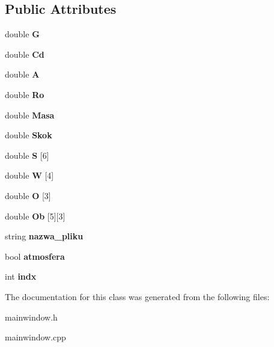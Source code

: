 \subsection*{Public Attributes}
\begin{DoxyCompactItemize}
\item 
\mbox{\label{class_main_window_ae07483988be03b22941a090dc36836df}} 
double {\bfseries G}
\item 
\mbox{\label{class_main_window_afe8a5e23f01e4779ad2bf9dddd470351}} 
double {\bfseries Cd}
\item 
\mbox{\label{class_main_window_a3e24497d6e558c83fd2b13d13aeb8db1}} 
double {\bfseries A}
\item 
\mbox{\label{class_main_window_a555e4c65f17f825ed8790bb592cafed6}} 
double {\bfseries Ro}
\item 
\mbox{\label{class_main_window_a59ffdff998bf720fca8709eec9035b26}} 
double {\bfseries Masa}
\item 
\mbox{\label{class_main_window_ab319253eb1520a69c4d8b435f4c54330}} 
double {\bfseries Skok}
\item 
\mbox{\label{class_main_window_a8cdea7d6a643c5fd2cfdcccc7b07ae28}} 
double {\bfseries S} \mbox{[}6\mbox{]}
\item 
\mbox{\label{class_main_window_aff1acdcf582000aa1f7e764ba590aa9d}} 
double {\bfseries W} \mbox{[}4\mbox{]}
\item 
\mbox{\label{class_main_window_ae6e89bf5abd465f0ca42d42e76ce4ec2}} 
double {\bfseries O} \mbox{[}3\mbox{]}
\item 
\mbox{\label{class_main_window_abf84e162db3023e0da8a062681906ace}} 
double {\bfseries Ob} \mbox{[}5\mbox{]}\mbox{[}3\mbox{]}
\item 
\mbox{\label{class_main_window_ad62f37d4092d5c8f2fcb64adf9eab349}} 
string {\bfseries nazwa\+\_\+pliku}
\item 
\mbox{\label{class_main_window_a728146f11fd01f59fed7e9af021a61bd}} 
bool {\bfseries atmosfera}
\item 
\mbox{\label{class_main_window_a353964a574b9af9328cf43567da94fd2}} 
int {\bfseries indx}
\end{DoxyCompactItemize}


The documentation for this class was generated from the following files\+:\begin{DoxyCompactItemize}
\item 
mainwindow.\+h\item 
mainwindow.\+cpp\end{DoxyCompactItemize}

